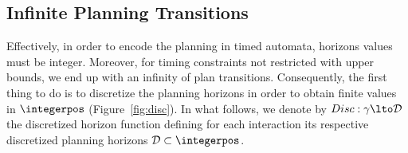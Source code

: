\subsection{Infinite Planning Transitions} 

Effectively, in order to encode the planning in timed automata, horizons values must
be integer. Moreover, for timing constraints not restricted with upper bounds, we end up with an infinity of plan
transitions. Consequently, the first thing to do is to discretize the planning horizons in order
to obtain finite values in $\integerpos$ (Figure~\ref{fig:disc}). In what follows, we denote
by $Disc:\gamma\lto\mathcal{D}$ the discretized horizon function defining for each interaction
its respective discretized planning horizons $\mathcal{D}\subset\integerpos$.



